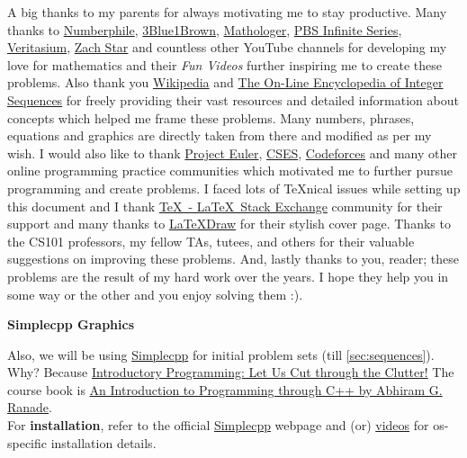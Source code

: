 \documentclass[../Problems]{subfiles}
\begin{document}
A big thanks to my parents for always motivating me to stay productive. Many thanks to \href{https://www.youtube.com/@numberphile}{Numberphile}, \href{https://www.youtube.com/@3blue1brown}{3Blue1Brown}, \href{https://www.youtube.com/@Mathologer}{Mathologer}, \href{https://www.youtube.com/@pbsinfiniteseries}{PBS Infinite Series}, \href{https://www.youtube.com/@veritasium}{Veritasium}, \href{https://www.youtube.com/@zachstar}{Zach Star} and countless other YouTube channels for developing my love for mathematics and their \emph{Fun Videos} further inspiring me to create these problems. Also thank you \href{https://en.wikipedia.org/wiki/Main_Page}{Wikipedia} and \href{http://oeis.org/}{The On-Line Encyclopedia of Integer Sequences} for freely providing their vast resources and detailed information about concepts which helped me frame these problems. Many numbers, phrases, equations and graphics are directly taken from there and modified as per my wish. I would also like to thank \href{https://projecteuler.net/}{Project Euler}, \href{https://cses.fi/problemset}{CSES}, \href{https://codeforces.com/}{Codeforces} and many other online programming practice communities which motivated me to further pursue programming and create problems. I faced lots of \TeX nical issues while setting up this document and I thank \href{tex.stackexchange.com}{\TeX\ - \LaTeX\ Stack Exchange} community for their support and many thanks to \href{https://latexdraw.com/tikz-cover-pages-gallery/}{\LaTeX Draw} for their stylish cover page. Thanks to the CS101 professors, my fellow TAs, tutees, and others for their valuable suggestions on improving these problems. And, lastly thanks to you, reader; these problems are the result of my hard work over the years. I hope they help you in some way or the other and you enjoy solving them :).
\begin{center}
	\textbf{\Large{Simplecpp Graphics}}
\end{center}
Also, we will be using \href{https://www.cse.iitb.ac.in/~ranade/simplecpp/}{Simplecpp} for initial problem sets (till \ref{sec:sequences}).
Why? Because \href{https://www.cse.iitb.ac.in/~ranade/iticse16.pdf}{Introductory Programming: Let Us Cut through the Clutter!} The course book is \href{https://www.cse.iitb.ac.in/~ranade/book.html}{An Introduction to Programming through C++ by Abhiram G. Ranade}.\\
For \textbf{installation}, refer to the official \href{https://www.cse.iitb.ac.in/~ranade/simplecpp/}{Simplecpp} webpage and (or) \href{https://drive.google.com/drive/folders/1bsUNh17eE4fWhMhh--hTnQm8dUaywdyx}{videos} for os-specific installation details.\\
\end{document}
